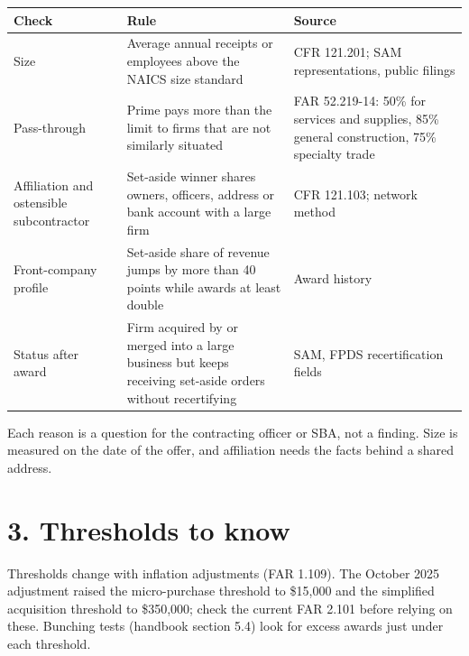 \documentclass[letterpaper,11pt]{article}
\begin{document}
\begingroup\small\setlength{\tabcolsep}{4pt}\renewcommand{\arraystretch}{1.25}
\begin{longtable}[l]{@{}>{\raggedright\arraybackslash}p{}>{\raggedright\arraybackslash}p{}>{\raggedright\arraybackslash}p{}@{}}
\rowcolor{coolblack}\leavevmode\color{white}\bfseries Check & \leavevmode\color{white}\bfseries Rule & \leavevmode\color{white}\bfseries Source \\
\endhead
Size & Average annual receipts or employees above the NAICS size standard & 13 CFR 121.201; SAM representations, public filings \\
Pass-through & Prime pays more than the limit to firms that are not similarly situated & FAR 52.219-14: 50\% for services and supplies, 85\% general construction, 75\% specialty trade \\
Affiliation and ostensible subcontractor & Set-aside winner shares owners, officers, address or bank account with a large firm & 13 CFR 121.103; network method \\
Front-company profile & Set-aside share of revenue jumps by more than 40 points while awards at least double & Award history \\
Status after award & Firm acquired by or merged into a large business but keeps receiving set-aside orders without recertifying & SAM, FPDS recertification fields \\
\end{longtable}\endgroup

Each reason is a question for the contracting officer or SBA, not a
finding. Size is measured on the date of the offer, and affiliation
needs the facts behind a shared address.

\hypertarget{thresholds-to-know}{%
\section*{3. Thresholds to know}\label{thresholds-to-know}}

Thresholds change with inflation adjustments (FAR 1.109). The October
2025 adjustment raised the micro-purchase threshold to \$15,000 and the
simplified acquisition threshold to \$350,000; check the current FAR
2.101 before relying on these. Bunching tests (handbook section 5.4)
look for excess awards just under each threshold.
\end{document}
